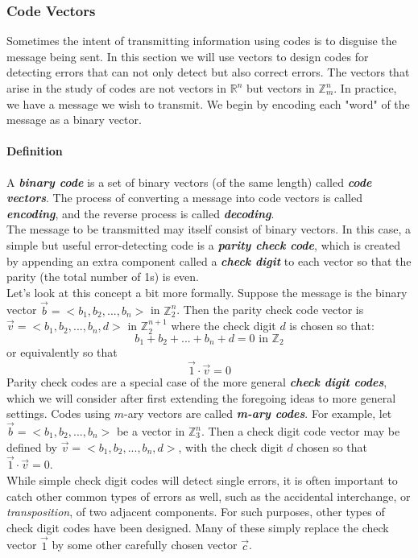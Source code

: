 \documentclass{article}
\newcommand{\p}[1]{\paragraph{#1}} %
\newcommand{\tib}[1]{\textbf{\textit{#1}}} %
\begin{document}
		\subsubsection{Code Vectors}
		Sometimes the intent of transmitting information using codes is to disguise the message 
		being sent. In this section we will use vectors to design codes for detecting errors that can 
		not only detect but also correct errors. The vectors that arise in the study of codes are not 
		vectors in $\mathbb{R}^n$ but vectors in $\mathbb{Z}_m^n$. In practice, we have a 
		message we wish to transmit. We begin by encoding each "word" of the message as a 
		binary vector. \\
		
		\p{Definition} A \tib{binary code} is a set of binary vectors (of the same length) called 
		\tib{code vectors}. The process of converting a message into code vectors is called 
		\tib{encoding}, and the reverse process is called \tib{decoding}. \\
		
		The message to be transmitted may itself consist of binary vectors. In this case, a simple 
		but useful error-detecting code is a \tib{parity check code}, which is created by appending
		an extra component called a \tib{check digit} to each vector so that the parity (the total 
		number of 1s) is even. \\
		
		Let's look at this concept a bit more formally. Suppose the message is the binary vector $
		\vec{b} = <b_1,b_2,...,b_n>$ in $\mathbb{Z}_2^n$. Then the parity check code vector is $
		\vec{v} = <b_1,b_2,...,b_n,d>$ in $\mathbb{Z}_2^{n+1}$ where the check digit $d$ is chosen 
		so that:
		\[ b_1 + b_2 + ... + b_n + d = 0 \text{ in } \mathbb{Z}_2 \]
		or equivalently so that
		\[ \vec{1} \cdot \vec{v} = 0 \]
		Parity check codes are a special case of the more general \tib{check digit codes}, which we 
		will consider after first extending the foregoing ideas to more general settings. Codes using 
		$m$-ary vectors are called \tib{m-ary codes}. For example, let $\vec{b} = <b_1,b_2,...,b_n>$ 
		be a vector in $\mathbb{Z}_3^n$. Then a check digit code vector may be defined by $\vec{v} 
		= <b_1,b_2,...,b_n,d>$, with the check digit $d$ chosen so that $\vec{1} \cdot \vec{v} = 0$. \\
		
		While simple check digit codes will detect single errors, it is often important to catch other 
		common types of errors as well, such as the accidental interchange, or \textit{transposition}, 
		of two adjacent components. For such purposes, other types of check digit codes have been 
		designed. Many of these simply replace the check vector $\vec{1}$ by some other carefully 
		chosen vector $\vec{c}$. 
		
\end{document}
